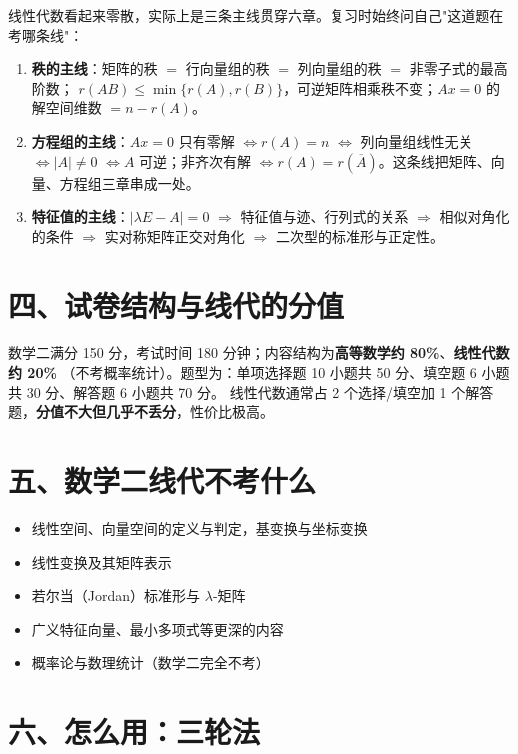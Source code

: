 线性代数看起来零散，实际上是三条主线贯穿六章。复习时始终问自己"这道题在考哪条线"：

\begin{enumerate}
  \item \textbf{秩的主线}：矩阵的秩 $=$ 行向量组的秩 $=$ 列向量组的秩 $=$ 非零子式的最高阶数；
        $r(AB)\le\min\{r(A),r(B)\}$，可逆矩阵相乘秩不变；$Ax=0$ 的解空间维数 $=n-r(A)$。
  \item \textbf{方程组的主线}：$Ax=0$ 只有零解 $\iff r(A)=n$ $\iff$ 列向量组线性无关 $\iff |A|\ne0$
        $\iff A$ 可逆；非齐次有解 $\iff r(A)=r(\overline A)$。这条线把矩阵、向量、方程组三章串成一处。
  \item \textbf{特征值的主线}：$|\lambda E-A|=0$ $\Rightarrow$ 特征值与迹、行列式的关系 $\Rightarrow$
        相似对角化的条件 $\Rightarrow$ 实对称矩阵正交对角化 $\Rightarrow$ 二次型的标准形与正定性。
\end{enumerate}

\section*{四、试卷结构与线代的分值}

数学二满分 150 分，考试时间 180 分钟；内容结构为\textbf{高等数学约 80\%}、\textbf{线性代数约 20\%}
（不考概率统计）。题型为：单项选择题 10 小题共 50 分、填空题 6 小题共 30 分、解答题 6 小题共 70 分。
线性代数通常占 2 个选择/填空加 1 个解答题，\textbf{分值不大但几乎不丢分}，性价比极高。

\section*{五、数学二线代不考什么}

\begin{itemize}
  \item 线性空间、向量空间的定义与判定，基变换与坐标变换
  \item 线性变换及其矩阵表示
  \item 若尔当（Jordan）标准形与 $\lambda$-矩阵
  \item 广义特征向量、最小多项式等更深的内容
  \item 概率论与数理统计（数学二完全不考）
\end{itemize}

\section*{六、怎么用：三轮法}


